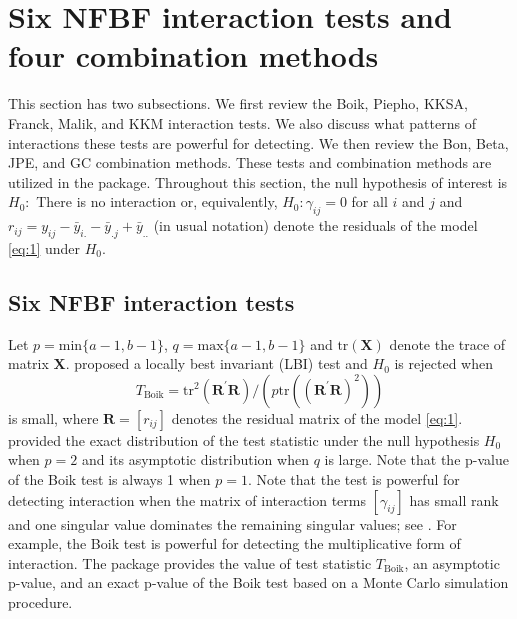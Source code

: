 \section{Six NFBF interaction tests and four combination methods}
\noindent This section has two subsections. We first review the Boik, Piepho, KKSA, Franck, Malik, and KKM interaction tests. We also discuss what patterns of interactions these tests are {powerful for detecting}. We then review the Bon, Beta, JPE, and GC combination methods. These tests and combination methods are utilized in the  package. Throughout this section, {the null hypothesis of interest} is $H_0:$ There is no interaction or, equivalently, $H_0: \gamma_{ij}=0$ for all $i$ and $j$ and $r_{ij}=y_{ij}-\bar{y}_{i.}-\bar{y}_{.j}+\bar{y}_{..}$ (in usual notation) denote the residuals of the model \ref{eq:1} under $H_0$.   

\subsection{Six NFBF interaction tests}
\noindent {} Let $p=\text{min}\{a-1,b-1\}$, $q=\text{max}\{a-1,b-1\}$ and $\text{tr}\left(\mathbold{X}\right)$ denote the trace of matrix $\mathbold{X}$. \citet{Boik:1993} proposed a locally best invariant (LBI) test and $H_0$ is rejected when 
\[T_{\text{Boik}}=\text{tr}^{2}\left(\mathbold{R}^{\prime}\mathbold{R}\right)/\left(p\text{tr}\left(\left(\mathbold{R}^{\prime}\mathbold{R}\right)^2\right)\right) \]
is small, where $\mathbold{R}=[r_{ij}]$ denotes the residual matrix of the model \ref{eq:1}. \citet{Boik:1993} provided the exact distribution of the test statistic under the null hypothesis $H_0$ when $p=2$ and its asymptotic distribution when $q$ is large. Note that the p-value of the Boik test is always {1} when $p=1$. Note that { the \citet{Boik:1993} test is powerful for detecting} interaction when the matrix of interaction terms $[\gamma_{ij}]$ has small rank and one singular value dominates the remaining singular values; see \citet{Boik:1993b}. For example, the Boik test is powerful for detecting the multiplicative form of interaction. The package  provides the value of test statistic $T_{\text{Boik}}$, an asymptotic p-value, and an exact p-value of the Boik test based on a Monte Carlo simulation procedure. 

